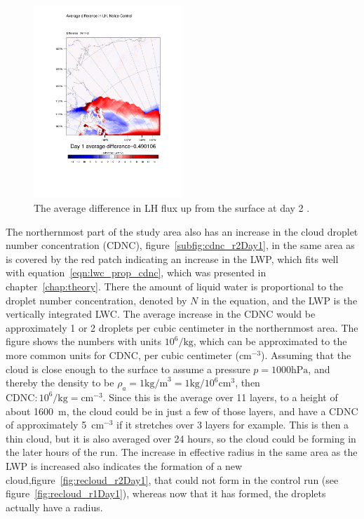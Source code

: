 \begin{figure}
\centering
\includegraphics[width=0.5\textwidth]{results/noice/diff_NoIce_LH_Day1.pdf}
\caption{The average difference in LH flux up from the surface at day 2 .}
\label{fig:lh_r2Day1}
\end{figure}
The northernmost part of the study area also has an increase in the cloud droplet number concentration (CDNC), figure~\ref{subfig:cdnc_r2Day1}, in the same area as is covered by the red patch indicating an increase in the LWP, which fits well with equation~\ref{eqn:lwc_prop_cdnc}, which was presented in chapter~\ref{chap:theory}. There the amount of liquid water is proportional to the droplet number concentration, denoted by $N$ in the equation, and the LWP is the vertically integrated LWC. The average increase in the CDNC would be approximately 1 or 2 droplets per cubic centimeter in the northernmost area. The figure shows the numbers with units $10^6/\text{kg}$, which can be approximated to the more common units for CDNC, per cubic centimeter ($\text{cm}^{-3}$). Assuming that the cloud is close enough to the surface to assume a pressure $p=1000\text{hPa}$, and thereby the density to be $\rho_a = 1\text{kg/m}^3=1\text{kg/}10^6\text{cm}^3$, then $\text{CDNC} : 10^6/\text{kg} = \text{cm}^{-3}$. Since this is the average over 11 layers, to a height of about 1600~m, the cloud could be in just a few of those layers, and have a CDNC of approximately 5~$\text{cm}^{-3}$ if it stretches over 3 layers for example. This is then a thin cloud, but it is also averaged over 24 hours, so the cloud could be forming in the later hours of the run. The increase in effective radius in the same area as the LWP is increased also indicates the formation of a new cloud,figure~\ref{fig:recloud_r2Day1}, that could not form in the control run (see figure~\ref{fig:recloud_r1Day1}), whereas now that it has formed, the droplets actually have a radius.


